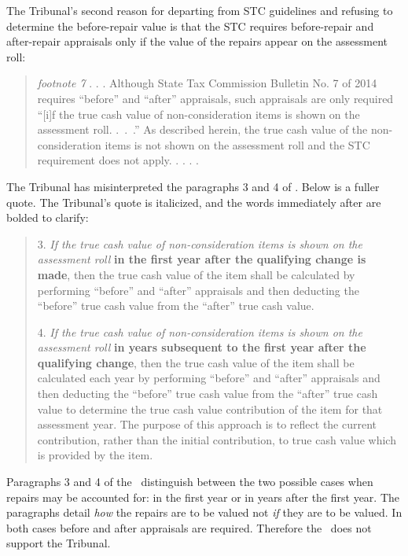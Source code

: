 \documentclass[12pt,\documentclassflag]{michiganCourtOfAppealsBrief}
\begin{document}
The Tribunal's second reason for departing from STC guidelines and refusing to determine the before-repair value is that the STC requires before-repair and after-repair appraisals only if the value of the repairs appear on the assessment roll:

\begin{quote}
  {\em footnote 7} . . .  Although State Tax Commission Bulletin No. 7 of 2014 requires ``before'' and ``after'' appraisals, such appraisals are only required ``[i]f the true cash value of non-consideration items is shown on the assessment roll. .~.~.'' As described herein, the true cash value of the non-consideration items is not shown on the assessment roll and the STC requirement does not apply. . . . \reconsiderationDenied[2].
\end{quote}

The Tribunal has misinterpreted the paragraphs 3 and 4 of . Below is a fuller quote. The Tribunal's quote is italicized, and the words immediately after are bolded to clarify:

\begin{quotation}
3. {\em If the true cash value of non-consideration items is shown on the assessment roll} \textbf{in the first year after the qualifying change is made}, then the true cash value of the item shall be calculated by performing ``before'' and ``after'' appraisals and then deducting the ``before'' true cash value from the ``after'' true cash value.

4. {\em If the true cash value of non-consideration items is shown on the assessment roll} \textbf{in years subsequent to the first year after the qualifying change}, then the true cash value of the item shall be calculated each year by performing ``before'' and ``after'' appraisals and then deducting the ``before'' true cash value from the ``after'' true cash value to determine the true cash value contribution of the item for that assessment year. The purpose of this approach is to reflect the current contribution, rather than the initial contribution, to true cash value which is provided by the item.
\end{quotation}

Paragraphs 3 and 4 of the \cite[s]{STC Bulletin}\ distinguish between the two possible cases when repairs may be accounted for: in the first year or in years after the first year. The paragraphs detail {\em how} the repairs are to be valued not {\em if} they are to be valued. In both cases before and after appraisals are required. Therefore the \cite[s]{STC Bulletin}\ does not support the Tribunal.
\end{document}
